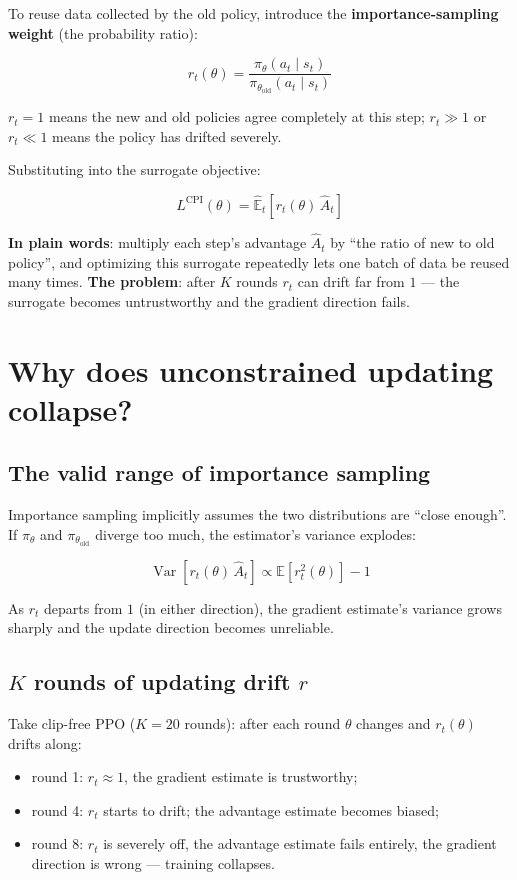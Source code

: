 \documentclass{article}
\begin{document}
To reuse data collected by the old policy, introduce the \textbf{importance-sampling weight} (the probability ratio):

\[
\boxed{r_t(\theta) = \frac{\pi_\theta(a_t \mid s_t)}{\pi_{\theta_\text{old}}(a_t \mid s_t)}}
\]

$r_t = 1$ means the new and old policies agree completely at this step; $r_t \gg 1$ or $r_t \ll 1$ means the policy has drifted severely.

Substituting into the surrogate objective:

\[
L^{\text{CPI}}(\theta) = \hat{\mathbb{E}}_t\!\left[r_t(\theta)\,\hat{A}_t\right]
\]

\textbf{In plain words}: multiply each step's advantage $\hat{A}_t$ by ``the ratio of new to old policy'', and optimizing this surrogate repeatedly lets one batch of data be reused many times. \textbf{The problem}: after $K$ rounds $r_t$ can drift far from $1$ --- the surrogate becomes untrustworthy and the gradient direction fails.

\section*{Why does unconstrained updating collapse?}

\subsection*{The valid range of importance sampling}

Importance sampling implicitly assumes the two distributions are ``close enough''. If $\pi_\theta$ and $\pi_{\theta_\text{old}}$ diverge too much, the estimator's variance explodes:

\[
\operatorname{Var}\!\left[r_t(\theta)\,\hat{A}_t\right] \propto \mathbb{E}\!\left[r_t^2(\theta)\right] - 1
\]

As $r_t$ departs from $1$ (in either direction), the gradient estimate's variance grows sharply and the update direction becomes unreliable.

\subsection*{$K$ rounds of updating drift $r$}

Take clip-free PPO ($K=20$ rounds): after each round $\theta$ changes and $r_t(\theta)$ drifts along:

\begin{itemize}
  \item round 1: $r_t \approx 1$, the gradient estimate is trustworthy;
  \item round 4: $r_t$ starts to drift; the advantage estimate becomes biased;
  \item round 8: $r_t$ is severely off, the advantage estimate fails entirely, the gradient direction is wrong --- training collapses.
\end{itemize}
\end{document}
